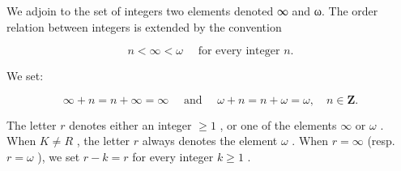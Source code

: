 
We adjoin to the set of integers two elements denoted ∞ and ω. The order relation between integers is extended by the convention

\[
n <   \infty <   \omega \quad \text { for   every   integer } n.
\]

We set:

\[
\infty + n = n + \infty = \infty \quad \text { and } \quad \omega + n = n + \omega = \omega , \quad n \in \mathbf {Z}.
\]

The letter \(r\) denotes either an integer \(\geqslant 1\) , or one of the elements \(\infty\) or \(\omega\) . When \(K \neq R\) , the letter \(r\) always denotes the element \(\omega\) . When \(r = \infty\) (resp. \(r = \omega\) ), we set \(r - k = r\) for every integer \(k \geqslant 1\) .

